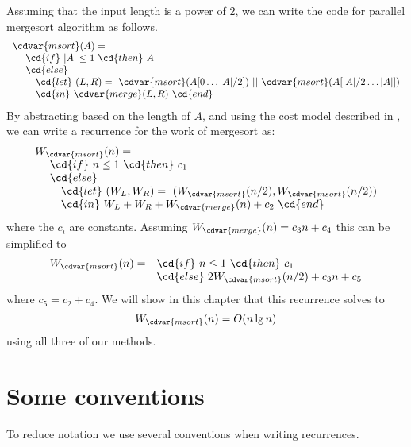 \begin{cluster}
\label{grp:ex:analysis::recurrences::mergesort}

\begin{example}
\label{ex:analysis::recurrences::mergesort} 
Assuming that the input length is a power of $2$, we can write the code for parallel mergesort algorithm as follows.
\[
\begin{array}{l}
\cdvar{msort}(A) = 
\\
~~~~\cd{if}~|A| \leq 1~\cd{then}~A 
\\
~~~~\cd{else}
\\
~~~~~~~\cd{let}~(L,R) 
  =~\cdvar{msort}(A[0 \dots |A|/2])~||~\cdvar{msort}(A[|A|/2 \dots|A|]) 
\\
~~~~~~~\cd{in}~\cdvar{merge}(L,R)~\cd{end}
\end{array}
\]
By abstracting based on the length of $A$, and using the cost model
described in , we can write a recurrence for the work of mergesort as:
\[
\begin{array}{l}
W_{\cdvar{msort}}(n) = 
\\
~~~~\cd{if}~n \leq 1~\cd{then}~c_1
\\
~~~~\cd{else}
\\
~~~~~~~\cd{let}~(W_L,W_R) 
  =~(W_{\cdvar{msort}}(n/2), W_{\cdvar{msort}}(n/2)) 
\\
~~~~~~~\cd{in}~W_L + W_R + W_{\cdvar{merge}}(n)+ c_2~\cd{end}
\end{array}
\]
where the $c_i$ are constants.    Assuming 
$W_{\cdvar{merge}}(n) = c_3 n + c_4$ this can be simplified to
\[
\begin{array}{ll}
W_{\cdvar{msort}}(n) = &\cd{if}~n \leq 1~\cd{then}~c_1
\\
&\cd{else}~2 W_{\cdvar{msort}}(n/2) + c_3 n + c_5
\end{array}
\]
where $c_5 = c_2 + c_4$.    We will show in this chapter that this
recurrence solves to
\[W_{\cdvar{msort}}(n) = O(n \lg n) \]
using all three of our methods.

\end{example}
\end{cluster}


\section{Some conventions}
\label{sec:analysis::recurrences::some-conventions}

\begin{cluster}
\label{grp:grm:analysis::recurrences::reduce}

\begin{gram}
\label{grm:analysis::recurrences::reduce}
To reduce notation we use several conventions when writing recurrences.

\end{gram}
\end{cluster}

